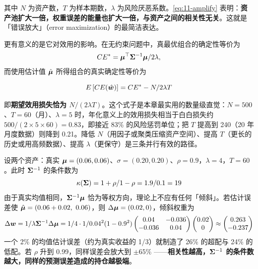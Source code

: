 其中 $N$ 为资产数，$T$ 为样本期数，$\lambda$ 为风险厌恶系数。\cref{eq:11-amplify} 表明：\textbf{资产池扩大一倍，权重误差的能量也扩大一倍，与资产之间的相关性无关}。这就是「错误放大」（error maximization）的最简洁表达。

更有意义的是它对效用的影响。在无约束问题中，真最优组合的确定性等价为
\[
  CE^{*} = \bm{\mu}^{\top}\bm{\Sigma}^{-1}\bm{\mu}/2\lambda,
\]
而使用估计值 $\hat{\bm{\mu}}$ 所得组合的真实确定性等价为

\begin{equation}\label{eq:11-ce-loss}
  E\left[CE(\hat{\bm{w}})\right] = CE^{*} - N/2\lambda T
\end{equation}

即\textbf{期望效用损失恰为 $N/(2\lambda T)$}。这个式子是本章最实用的数量级直觉：$N = 500$、$T = 60$（月）、$\lambda = 5$ 时，年化意义上的效用损失相当于白白损失约 $500/(2\times 5\times 60) = 0.83$，即接近 83\% 的风险惩罚单位；把 $T$ 提高到 240（20 年月度数据）则降到 0.21。降低 $N$（用因子或聚类压缩资产空间）、提高 $T$（更长的历史或用高频数据）、提高 $\lambda$（更保守）是三条并行有效的路径。

\begin{example}[错误放大的数值演示]\label{ex:11-error}
设两个资产：真实 $\bm{\mu} = (0.06, 0.06)$、$\sigma = (0.20, 0.20)$、$\rho = 0.9$，$\lambda = 4$，$T = 60$。此时 $\bm{\Sigma}^{-1}$ 的条件数为
\[
  \kappa(\bm{\Sigma}) = 1+\rho/1-\rho = 1.9/0.1 = 19
\]
由于真实均值相同，$\bm{\Sigma}^{-1}\bm{\mu}$ 恰为等权方向，理论上不应有任何「倾斜」。若估计误差使 $\hat{\bm{\mu}} = (0.06 + 0.02,\ 0.06)$，则 $\Delta\bm{\mu} = (0.02, 0)$，倾斜权重为
\[
  \Delta\bm{w} = 1/\lambda\bm{\Sigma}^{-1}\Delta\bm{\mu}
  = 1/4\cdot1/0.04^{2}(1-0.9^{2})
  \begin{pmatrix} 0.04 & -0.036 \\ -0.036 & 0.04 \end{pmatrix}
  \begin{pmatrix} 0.02 \\ 0 \end{pmatrix}
  \approx \begin{pmatrix} 0.263 \\ -0.237 \end{pmatrix}
\]
一个 2\% 的均值估计误差（约为真实收益的 1/3）就制造了 26\% 的超配与 24\% 的低配。若 $\rho$ 升到 0.99，同样误差会放大到 $\pm 65\%$ ——\textbf{相关性越高，$\bm{\Sigma}^{-1}$ 的条件数越大，同样的预测误差造成的持仓越极端}。
\end{example}

